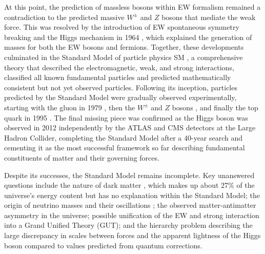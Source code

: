 \documentclass[../thesis.tex]{subfiles}
\begin{document}
At this point, the prediction of massless bosons within \acs{EW} formalism remained a contradiction to the predicted massive $W^\pm$ and $Z$ bosons that mediate the weak force. This was resolved by the introduction of \acs{EW} spontaneous symmetry breaking and the Higgs mechanism in 1964 \citep{theory:higgs1,theory:higgs2,theory:brout_englert}, which explained the generation of masses for both the \acs{EW} bosons and fermions. Together, these developments culminated in the Standard Model of particle physics \acs{SM} \citep{intro:sm}, a comprehensive theory that described the electromagnetic, weak, and strong interactions, classified all known fundamental particles and predicted mathematically consistent but not yet observed particles. Following its inception, particles predicted by the Standard Model were gradually observed experimentally, starting with the gluon in 1979 \citep{intro:gluon}, then the $W^\pm$ and $Z$ bosons \citep{intro:W_obs,intro:Z_obs}, and finally the top quark in 1995 \citep{intro:top_cdf,intro:top_d0}. The final missing piece was confirmed as the Higgs boson was observed in 2012 independently by the \acs{ATLAS} \citep{theory:higgs_atlas} and \acs{CMS} \citep{theory:higgs_cms} detectors at the Large Hadron Collider, completing the Standard Model after a 40-year search and cementing it as the most successful framework so far describing fundamental constituents of matter and their governing forces.

Despite its successes, the Standard Model remains incomplete. Key unanswered questions include the nature of dark matter \citep{PDG}, which makes up about 27\% of the universe’s energy content but has no explanation within the Standard Model; the origin of neutrino masses and their oscillations \citep{PhysRevLett.81.1562}; the observed matter-antimatter asymmetry in the universe; possible unification of the \acs{EW} and strong interaction into a Grand Unified Theory (\acs{GUT}); and the hierarchy problem describing the large discrepancy in scales between forces and the apparent lightness of the Higgs boson compared to values predicted from quantum corrections. 
\end{document}
